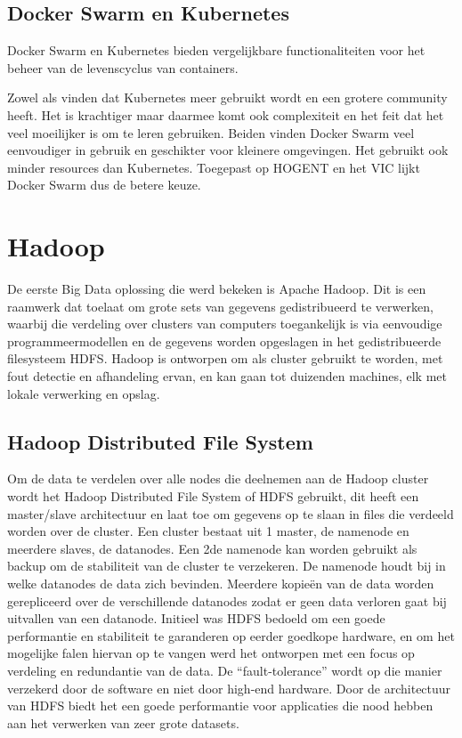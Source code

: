 \subsection{Docker Swarm en Kubernetes}
Docker Swarm en Kubernetes bieden vergelijkbare functionaliteiten voor het beheer van de levenscyclus van containers.

Zowel \textcite{Rosen2022} als \textcite{Chukwudi2023} vinden dat Kubernetes meer gebruikt wordt en een grotere community heeft. Het is krachtiger maar daarmee komt ook complexiteit en het feit dat het veel moeilijker is om te leren gebruiken.
Beiden vinden Docker Swarm veel eenvoudiger in gebruik en geschikter voor kleinere omgevingen. Het gebruikt ook minder resources dan Kubernetes.
\newline
Toegepast op HOGENT en het VIC lijkt Docker Swarm dus de betere keuze.


\section{Hadoop}
De eerste Big Data oplossing die werd bekeken is Apache Hadoop. Dit is een raamwerk dat toelaat om grote sets van gegevens gedistribueerd te verwerken, waarbij die verdeling over clusters van computers toegankelijk is via eenvoudige programmeermodellen en de gegevens worden opgeslagen in het gedistribueerde filesysteem HDFS.
\newline
Hadoop is ontworpen om als cluster gebruikt te worden, met fout detectie en afhandeling ervan, en kan gaan tot duizenden machines, elk met lokale verwerking en opslag. \autocite{ASF2022}

\subsection{Hadoop Distributed File System}
Om de data te verdelen over alle nodes die deelnemen aan de Hadoop cluster wordt het Hadoop Distributed File System of HDFS gebruikt, dit heeft een \newline master/slave architectuur en laat toe om gegevens op te slaan in files die verdeeld worden over de cluster. Een cluster bestaat uit 1 master, de namenode en meerdere slaves, de datanodes. Een 2de namenode kan worden gebruikt als backup om de stabiliteit van de cluster te verzekeren.
\newline
De namenode houdt bij in welke datanodes de data zich bevinden. Meerdere kopieën van de data worden gerepliceerd over de verschillende datanodes zodat er geen data verloren gaat bij uitvallen van een datanode.
\newline
\newline
Initieel was HDFS bedoeld om een goede performantie en stabiliteit te garanderen op eerder goedkope hardware, en om het mogelijke falen hiervan op te vangen werd het ontworpen met een focus op verdeling en redundantie van de data. De ``fault-tolerance'' wordt op die manier verzekerd door de software en niet door high-end hardware.
Door de architectuur van HDFS biedt het een goede performantie voor applicaties die nood hebben aan het verwerken van zeer grote datasets.\autocite{Borthakur2007}
\newline
\newline
